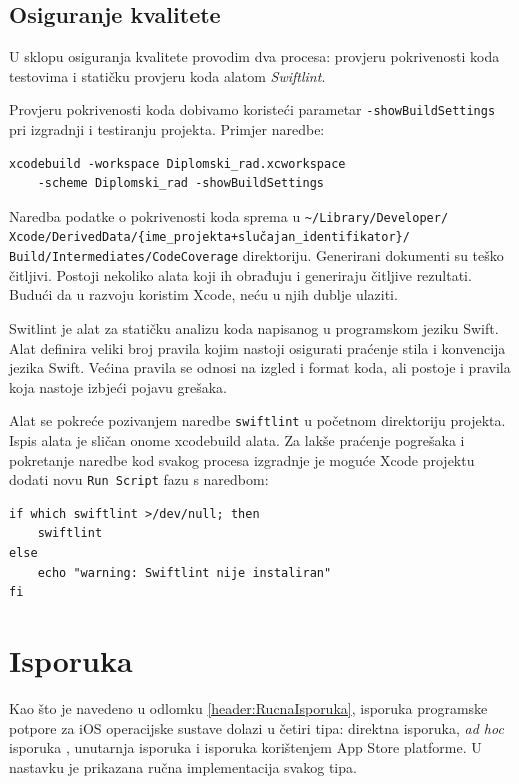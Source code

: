 \documentclass[times, utf8, diplomski, numeric]{fer}
\begin{document}
\begin{appendices}
\subsection{Osiguranje kvalitete} \label{OsiguranjeKvaliteteImplementacija}

U sklopu osiguranja kvalitete provodim dva procesa: provjeru pokrivenosti koda testovima i statičku provjeru koda alatom \textit{Swiftlint}.

Provjeru pokrivenosti koda dobivamo koristeći parametar \verb|-showBuildSettings| pri izgradnji i testiranju projekta. Primjer naredbe:

\begin{verbatim}
xcodebuild -workspace Diplomski_rad.xcworkspace
    -scheme Diplomski_rad -showBuildSettings
\end{verbatim}

Naredba podatke o pokrivenosti koda sprema u \verb|~/Library/Developer/|\\\verb|Xcode/DerivedData/{ime_projekta+slučajan_identifikator}/|\\\verb|Build/Intermediates/CodeCoverage| direktoriju. Generirani dokumenti su teško čitljivi. Postoji nekoliko alata koji ih obrađuju i generiraju čitljive rezultati. Budući da u razvoju koristim Xcode, neću u njih dublje ulaziti.

Switlint je alat za statičku analizu koda napisanog u programskom jeziku Swift. Alat definira veliki broj pravila kojim nastoji osigurati praćenje stila i konvencija jezika Swift. Većina pravila se odnosi na izgled i format koda, ali postoje i pravila koja nastoje izbjeći pojavu grešaka.

Alat se pokreće pozivanjem naredbe \verb|swiftlint| u početnom direktoriju projekta. Ispis alata je sličan onome xcodebuild alata. Za lakše praćenje pogrešaka i pokretanje naredbe kod svakog procesa izgradnje je moguće Xcode projektu dodati novu \verb|Run Script| fazu s naredbom:

\begin{verbatim}
if which swiftlint >/dev/null; then
    swiftlint
else
    echo "warning: Swiftlint nije instaliran"
fi
\end{verbatim}



\section{Isporuka} \label{header:ImplementacijaIsporuke}

Kao što je navedeno u odlomku \ref{header:RucnaIsporuka}, isporuka programske potpore za iOS operacijske sustave dolazi u četiri tipa: direktna isporuka, \textit{ad hoc} isporuka , unutarnja isporuka i isporuka korištenjem App Store platforme. U nastavku je prikazana ručna implementacija svakog tipa.


\end{appendices}
\end{document}
